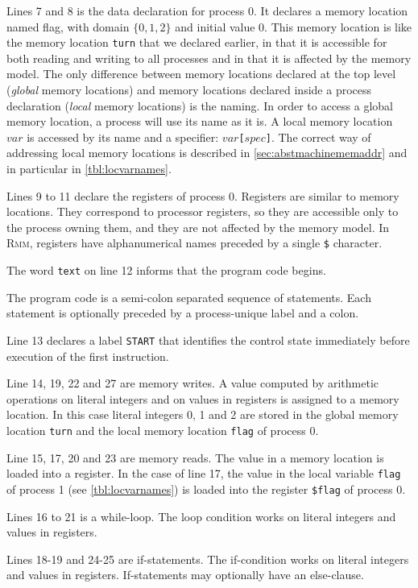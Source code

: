 \documentclass[a4paper]{article}
\newcommand{\rmm}{\textsc{Rmm}}
\begin{document}
Lines 7 and 8 is the data declaration for process 0. It declares a
memory location named flag, with domain $\{0,1,2\}$ and initial value
0. This memory location is like the memory location \verb+turn+ that
we declared earlier, in that it is accessible for both reading and
writing to all processes and in that it is affected by the memory
model. The only difference between memory locations declared at the
top level (\emph{global} memory locations) and memory locations
declared inside a process declaration (\emph{local} memory locations)
is the naming. In order to access a global memory location, a process
will use its name as it is. A local memory location $var$ is accessed
by its name and a specifier: $var$\verb+[+$spec$\verb+]+. The correct
way of addressing local memory locations is described in
\cref{sec:abstmachinememaddr} and in particular in
\cref{tbl:locvarnames}.

Lines 9 to 11 declare the registers of process 0. Registers are
similar to memory locations. They correspond to processor registers,
so they are accessible only to the process owning them, and they are
not affected by the memory model. In \rmm, registers have
alphanumerical names preceded by a single \verb+$+ character.

The word \verb+text+ on line 12 informs that the program code begins.

The program code is a semi-colon separated sequence of
statements. Each statement is optionally preceded by a process-unique
label and a colon.

Line 13 declares a label \verb+START+ that identifies the control
state immediately before execution of the first instruction.

Line 14, 19, 22 and 27 are memory writes. A value computed by
arithmetic operations on literal integers and on values in registers
is assigned to a memory location. In this case literal integers 0, 1
and 2 are stored in the global memory location \verb+turn+ and the
local memory location \verb+flag+ of process 0.

Line 15, 17, 20 and 23 are memory reads. The value in a memory
location is loaded into a register. In the case of line 17, the value
in the local variable \verb+flag+ of process 1 (see
\cref{tbl:locvarnames}) is loaded into the register \verb+$flag+ of
process 0.

Lines 16 to 21 is a while-loop. The loop condition works on literal
integers and values in registers.

Lines 18-19 and 24-25 are if-statements. The if-condition works on
literal integers and values in registers. If-statements may optionally
have an else-clause.
\end{document}
